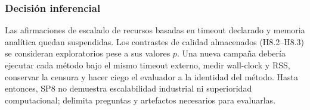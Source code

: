 \subsubsection{Decisión inferencial}

Las afirmaciones de escalado de recursos basadas en timeout declarado y memoria analítica quedan suspendidas. Los contrastes de calidad almacenados (H8.2--H8.3) se consideran exploratorios pese a sus valores $p$. Una nueva campaña debería ejecutar cada método bajo el mismo timeout externo, medir wall-clock y RSS, conservar la censura y hacer ciego el evaluador a la identidad del método. Hasta entonces, SP8 no demuestra escalabilidad industrial ni superioridad computacional; delimita preguntas y artefactos necesarios para evaluarlas.
